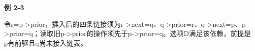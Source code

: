 {\color{ink}\bfseries 例 2-3}\par\vspace{1bp}令r=\allowbreak{}p->prior，插入后的四条链接须为r->next=\allowbreak{}q、q->prior=\allowbreak{}r、q->next=\allowbreak{}p、p->prior=\allowbreak{}q；读取旧p->prior的操作须先于p->prior=\allowbreak{}q。选项D满足该依赖，前提是p有前驱且q尚未接入链表。
